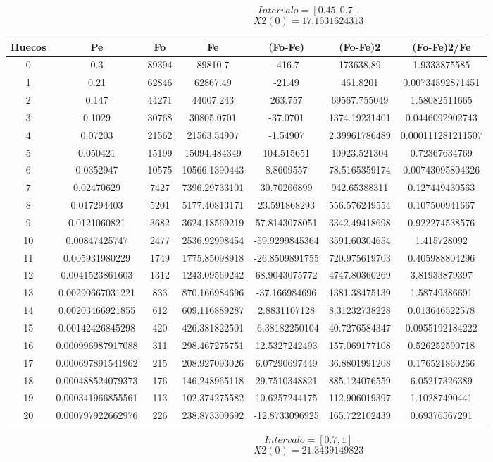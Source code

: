 \documentclass{article}
\begin{document}
$$
Intervalo = [0.45, 0.7]
$$
$$
X2(0) = 17.1631624313
$$
\begin{tabular}{|c|c|c|c|c|c|c|}
Huecos&Pe&Fo&Fe&(Fo{-}Fe)&(Fo{-}Fe)2&(Fo{-}Fe)2/Fe\\
\hline
0&0.3&89394&89810.7&{-}416.7&173638.89&1.9333875585\\
\hline
1&0.21&62846&62867.49&{-}21.49&461.8201&0.00734592871451\\
\hline
2&0.147&44271&44007.243&263.757&69567.755049&1.58082511665\\
\hline
3&0.1029&30768&30805.0701&{-}37.0701&1374.19231401&0.0446092902743\\
\hline
4&0.07203&21562&21563.54907&{-}1.54907&2.39961786489&0.000111281211507\\
\hline
5&0.050421&15199&15094.484349&104.515651&10923.521304&0.72367634769\\
\hline
6&0.0352947&10575&10566.1390443&8.8609557&78.5165359174&0.00743095804326\\
\hline
7&0.02470629&7427&7396.29733101&30.70266899&942.65388311&0.127449430563\\
\hline
8&0.017294403&5201&5177.40813171&23.591868293&556.576249554&0.107500941667\\
\hline
9&0.0121060821&3682&3624.18569219&57.8143078051&3342.49418698&0.922274538576\\
\hline
10&0.00847425747&2477&2536.92998454&{-}59.9299845364&3591.60304654&1.415728092\\
\hline
11&0.005931980229&1749&1775.85098918&{-}26.8509891755&720.975619703&0.405988804296\\
\hline
12&0.0041523861603&1312&1243.09569242&68.9043075772&4747.80360269&3.81933879397\\
\hline
13&0.00290667031221&833&870.166984696&{-}37.166984696&1381.38475139&1.58749386691\\
\hline
14&0.00203466921855&612&609.116889287&2.8831107128&8.31232738228&0.013646522578\\
\hline
15&0.00142426845298&420&426.381822501&{-}6.38182250104&40.7276584347&0.0955192184222\\
\hline
16&0.000996987917088&311&298.467275751&12.5327242493&157.069177108&0.526252590718\\
\hline
17&0.000697891541962&215&208.927093026&6.07290697449&36.8801991208&0.176521860266\\
\hline
18&0.000488524079373&176&146.248965118&29.7510348821&885.124076559&6.05217326389\\
\hline
19&0.000341966855561&113&102.374275582&10.6257244175&112.906019397&1.10287490441\\
\hline
20&0.000797922662976&226&238.873309692&{-}12.8733096925&165.722102439&0.69376567291\\
\end{tabular}
$$
Intervalo = [0.7, 1]
$$
$$
X2(0) = 21.3439149823
$$
\end{document}
